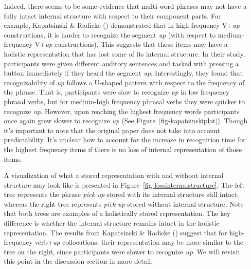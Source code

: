 \documentclass[
  12pt,
  letterpaper,
]{scrreprt}
\begin{document}
Indeed, there seems to be some evidence that multi-word phrases may not
have a fully intact internal structure with respect to their component
parts. For example, Kapatsinski \& Radicke
()
demonstrated that in high frequency V+\emph{up} constructions, it is
harder to recognize the segment \emph{up} (with respect to
medium-frequency V+\emph{up} constructions). This suggests that those
items may have a holistic representation that has lost some of its
internal structure. In their study, participants were given different
auditory sentences and tasked with pressing a button immediately if they
heard the segment \emph{up}. Interestingly, they found that
recognizability of \emph{up} follows a U-shaped pattern with respect to
the frequency of the phrase. That is, participants were slow to
recognize \emph{up} in low frequency phrasal verbs, but for medium-high
frequency phrasal verbs they were quicker to recognize \emph{up}.
However, upon reaching the highest frequency words participants once
again grew slower to recognize \emph{up} (See
Figure~\ref{fig-kapatsinskiplot}). Though it's important to note that
the original paper does not take into account predictability. It's
unclear how to account for the increase in recognition time for the
highest frequency items if there is no loss of internal representation
of those items.

A visualization of what a stored representation with and without
internal structure may look like is presented in
Figure~\ref{fig-lossinternalstructure}. The left tree represents the
phrase \emph{pick up} stored with its internal structure still intact,
whereas the right tree represents \emph{pick up} stored without internal
structure. Note that both trees are examples of a holistically stored
representation. The key difference is whether the internal structure
remains intact in the holistic representation. The results from
Kapatsinski \& Radicke
() suggest
that for high-frequency verb+\emph{up} collocations, their
representation may be more similar to the tree on the right, since
participants were slower to recognize \emph{up}. We will revisit this
point in the discussion section in more detail.
\end{document}

